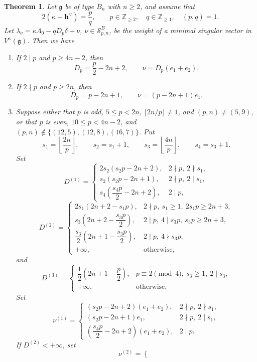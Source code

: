 \documentclass[11pt,a4paper]{amsart}
\newcommand{\ZZ}{\mathbb Z}
\theoremstyle{plain}
\newtheorem{theorem}{Theorem}[section]
\numberwithin{equation}{section}
\begin{document}
\begin{theorem}\label{Bconclusion}
Let $\mathfrak g$ be of type $B_n$ with $n\ge2$, and assume that 
\[
2(\kappa+\mathbf{h}^\vee)=\frac pq,
\qquad p\in\ZZ_{\ge2},\quad q\in\ZZ_{\ge1},\quad (p,q)=1.
\]
	Let  $\lambda_{\nu}=\kappa\Lambda_0-qD_p\delta+\nu$, \(\nu\in\mathcal S^B_{p,n}\),  be the weight of a minimal singular vector in $V^{\kappa}(\mathfrak{g})$. Then we have 
\begin{enumerate}
\item If $2\mid p$ and $p\ge4n-2$, then
\[
D_p=\frac p2-2n+2,\qquad
\nu=D_p(e_1+e_2).
\]
\item If $2\nmid p$ and $p\ge2n$, then
\[
D_p=p-2n+1,\qquad
\nu=(p-2n+1)e_1.
\]
\item Suppose either that \(p\) is odd, \(5\le p<2n\),
\(\lfloor2n/p\rfloor\ne1\), and \((p,n)\ne(5,9)\), or that
\(p\) is even, \(10\le p<4n-2\), and
\((p,n)\notin\{(12,5),(12,8),(16,7)\}\).
Put
\[
s_1=\left\lfloor\frac{2n}{p}\right\rfloor,\qquad
s_2=s_1+1,\qquad
s_3=\left\lfloor\frac{4n}{p}\right\rfloor,\qquad
s_4=s_3+1 .
\]
Set
\[
D^{(1)}=
\begin{cases}
2s_2(s_2p-2n+2), & 2\nmid p,\ 2\nmid s_1,\\
s_2(s_2p-2n+1), & 2\nmid p,\ 2\mid s_1,\\
s_4\left(\dfrac{s_4p}{2}-2n+2\right), & 2\mid p,
\end{cases}
\]
\[
D^{(2)}=
\begin{cases}
2s_1(2n+2-s_1p),
& 2\nmid p,\ s_1\ge1,\ 2s_1p\ge2n+3,\\
s_3\left(2n+2-\dfrac{s_3p}{2}\right),
& 2\mid p,\ 4\mid s_3p,\ s_3p\ge2n+3,\\
\dfrac{s_3}{2}\left(2n+1-\dfrac{s_3p}{2}\right),
& 2\mid p,\ 4\nmid s_3p,\\
+\infty, & \text{otherwise},
\end{cases}
\]
and
\[
D^{(3)}=
\begin{cases}
\dfrac12\left(2n+1-\dfrac{p}{2}\right),
& p\equiv2\pmod4,\ s_3\ge1,\ 2\mid s_3,\\
+\infty, & \text{otherwise}.
\end{cases}
\]
Set
\[
\nu^{(1)}=
\begin{cases}
(s_2p-2n+2)(e_1+e_2), & 2\nmid p,\ 2\nmid s_1,\\
(s_2p-2n+1)e_1, & 2\nmid p,\ 2\mid s_1,\\
\left(\dfrac{s_4p}{2}-2n+2\right)(e_1+e_2), & 2\mid p.
\end{cases}
\]
If $D^{(2)}<+\infty$, set
\[
\nu^{(2)}=
\begin{cases}

\end{cases}\]
\end{enumerate}
\end{theorem}
\end{document}
